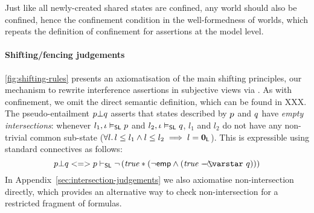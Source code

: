 Just like all newly-created shared states are confined, any world
should also be confined, hence the confinement condition in the
well-formedness of worlds, which repeats the definition of confinement
for assertions at the model level.


\paragraph{Shifting/fencing judgements}
\fig\ref{fig:shifting-rules} presents an axiomatisation of the main
shifting principles, our mechanism to rewrite interference assertions
in subjective views via \shiftRule. As with confinement, we omit the
direct semantic definition, which can be found in XXX.  The
pseudo-entailment $\separate{\lass{P}}{\lass{Q}}$ asserts that states
described by $\lass{P}$ and $\lass{Q}$ have \emph{empty
  intersections}: whenever $l_1, \lenv \slsat \lass{P}$ and $l_2,
\lenv \slsat \lass{Q}$, $l_1$ and $l_2$ do not have any non-trivial
common sub-state ($\forall l.\, l \leq l_1 \land l \leq l_2 \implies l =
\mathbf{0}_{\mathsf{L}}$). This is expressible using standard connectives as follows:
\[
\separate{\lass{P}}{\lass{Q}} <=> \lass{P} \slentails \neg\left( \m{true} * (\neg\emp \land (\m{true} \septraction \lass{Q}) ) \right)
\]
In Appendix~\ref{sec:intersection-judgements} we also axiomatise
non-intersection directly, which provides an alternative way to check
non-intersection for a restricted fragment of formulas.


